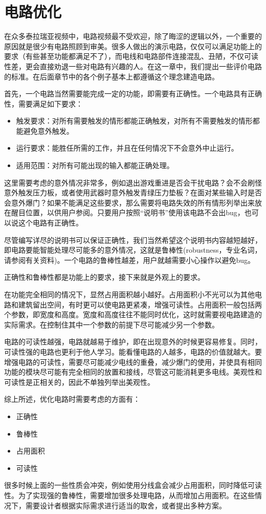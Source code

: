 \chapter{电路优化}

在众多泰拉瑞亚视频中，电路视频最不受欢迎，除了晦涩的逻辑以外，一个重要的原因就是很少有电路照顾到审美。很多人做出的演示电路，仅仅可以满足功能上的要求（有些甚至功能都满足不了），而电线和电路部件连接混乱、丑陋，不仅可读性差，更会直接劝退一些对电路有兴趣的人。在这一章中，我们提出一些评价电路的标准。在后面章节中的各个例子基本上都遵循这个理念建造电路。

首先，一个电路当然需要能完成一定的功能，即需要有正确性。一个电路具有正确性，需要满足如下要求：

\begin{itemize}
	\item 触发要求：对所有需要触发的情形都能正确触发，对所有不需要触发的情形都能避免意外触发。
	\item 运行要求：能胜任所需的工作，并且在任何情况下不会意外中止运行。
	\item 适用范围：对所有可能出现的输入都能正确处理。
\end{itemize}

这里需要考虑的意外情况非常多，例如退出游戏重进是否会干扰电路？会不会刷怪意外触发压力板，或者使用武器时意外触发青绿压力垫板？在面对某些输入时是否会意外爆门？如果不能满足这些要求，那么需要将电路失效的所有情形列举出来放在醒目位置，以供用户参阅。只要用户按照“说明书”使用该电路不会出bug，也可以说这个电路有正确性。

尽管编写详尽的说明书可以保证正确性，我们当然希望这个说明书内容越短越好，即电路要能智能处理尽可能多的意外情况，这就是鲁棒性(robustness，专业名词，请参阅有关资料)。一个电路的鲁棒性越差，用户就越需要小心操作以避免bug。

正确性和鲁棒性都是功能上的要求，接下来就是外观上的要求。

在功能完全相同的情况下，显然占用面积越小越好。占用面积小不光可以为其他电路和建筑留出空间，有时更可以使电路更紧凑，增强可读性。占用面积一般包括两个参数，即宽度和高度。宽度和高度往往不能同时优化，这时就需要视电路建造的实际需求。在控制住其中一个参数的前提下尽可能减少另一个参数。

电路的可读性越强，电路就越易于维护，即在出现意外的时候更容易修复。同时，可读性强的电路也更利于他人学习。能看懂电路的人越多，电路的价值就越大。要增强电路的可读性，需要尽可能减少电线的重叠，减少爆门的使用，并使具有相同功能的模块尽可能有完全相同的放置和接线，尽管这可能消耗更多电线。美观性和可读性是正相关的，因此不单独列举出美观性。

综上所述，优化电路时需要考虑的方面有：

\begin{itemize}
\item 正确性
\item 鲁棒性
\item 占用面积
\item 可读性
\end{itemize}

很多时候上面的一些性质会冲突，例如使用分线盒会减少占用面积，同时降低可读性。为了实现强的鲁棒性，需要增加很多处理电路，从而增加占用面积。在这些情况下，需要设计者根据实际需求进行适当的取舍，或者提出多种方案。